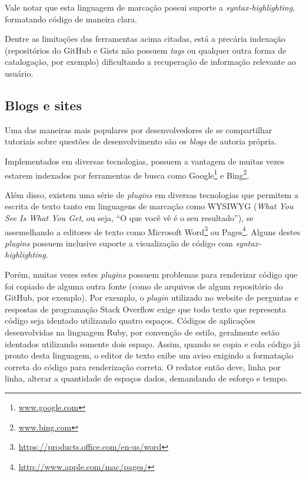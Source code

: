 Vale notar que esta linguagem de marcação possui suporte a \textit{syntax-highlighting}, formatando código de maneira clara.


Dentre as limitações das ferramentas acima citadas, está a precária indexação (repositórios do GitHub e Gists não possuem \textit{tags} ou qualquer outra forma de catalogação, por exemplo) dificultando a recuperação de informação relevante ao usuário.


\subsection{Blogs e sites}

Uma das maneiras mais populares por desenvolvedores de se compartilhar tutoriais sobre questões de desenvolvimento são os \textit{blogs} de autoria própria.

Implementados em diversas tecnologias, possuem a vantagem de muitas vezes estarem indexados por ferramentas de busca como Google\footnote{\url{www.google.com}} e Bing\footnote{\url{www.bing.com}}.

Além disso, existem uma série de \textit{plugins} em diversas tecnologias que permitem a escrita de texto tanto em linguagens de marcação como WYSIWYG (\textit{What You See Is What You Get}, ou seja, ``O que você vê é o seu resultado''), se assemelhando a editores de texto como Microsoft Word\footnote{\url{https://products.office.com/en-us/word}} ou Pages\footnote{\url{http://www.apple.com/mac/pages/}}. Alguns destes \textit{plugins} possuem inclusive suporte a visualização de código com \textit{syntax-highlighting}.

Porém, muitas vezes estes \textit{plugins} possuem problemas para renderizar código que foi copiado de alguma outra fonte (como de arquivos de algum repositório do GitHub, por exemplo). Por exemplo, o \textit{plugin} utilizado no website de perguntas e respostas de programação Stack Overflow exige que todo texto que representa código seja identado utilizando quatro espaços. Códigos de aplicações desenvolvidas na linguagem Ruby, por convenção de estilo, geralmente estão identados utilizando somente dois espaço. Assim, quando se copia e cola código já pronto desta linguagem, o editor de texto exibe um aviso exigindo a formatação correta do código para renderização correta. O redator então deve, linha por linha, alterar a quantidade de espaços dados, demandando de esforço e tempo.

